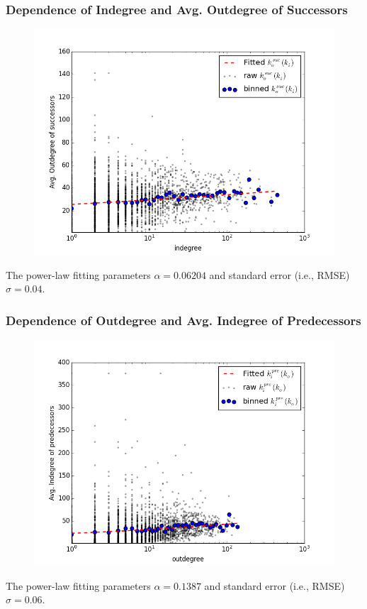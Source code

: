 \documentclass{beamer}
\begin{document}
\begin{frame}
\frametitle{Dependence of Indegree and Avg. Outdegree of Successors}
\begin{figure}
\includegraphics[width=0.8\linewidth]{figs/suc_out_in_d.png}
\end{figure}
\small{The power-law fitting parameters $\alpha=0.06204$ and standard error (i.e., RMSE) $\sigma= 0.04$.}
\end{frame}

\begin{frame}
\frametitle{Dependence of Outdegree and Avg. Indegree of Predecessors}
\begin{figure}
\includegraphics[width=0.8\linewidth]{figs/pre_in_out_d.png}
\end{figure}
\small{The power-law fitting parameters $\alpha=0.1387$ and standard error (i.e., RMSE) $\sigma= 0.06$.}
\end{frame}
\end{document}
